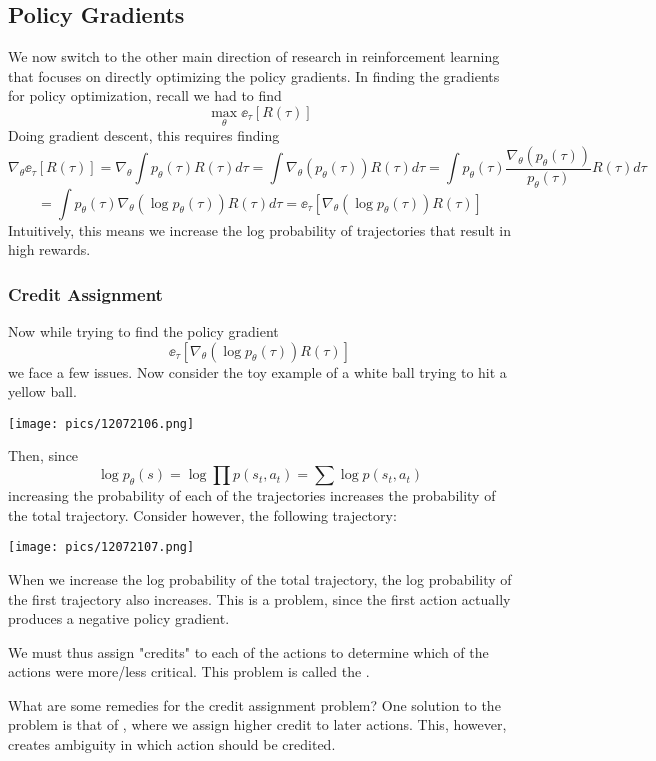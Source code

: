 \documentclass[11pt]{scrartcl}
\begin{document}
\subsection{Policy Gradients}
We now switch to the other main direction of research in reinforcement learning that focuses on directly optimizing the policy gradients. In finding the gradients for policy optimization, recall we had to find 
$$\max_{\theta}\ee_\tau[R(\tau)]$$
Doing gradient descent, this requires finding $$\nabla_\theta\ee_\tau[R(\tau)]=\nabla_\theta\int p_\theta(\tau)R(\tau)d\tau=\int \nabla_\theta(p_\theta(\tau))R(\tau)d\tau=\int p_\theta(\tau)\frac{\nabla_\theta(p_\theta(\tau))}{p_\theta(\tau)}R(\tau)d\tau$$
$$=\int p_\theta(\tau)\nabla_\theta(\log p_\theta(\tau))R(\tau)d\tau=\ee_\tau[\nabla_\theta(\log p_\theta(\tau))R(\tau)]$$
Intuitively, this means we increase the log probability of trajectories that result in high rewards. 

\subsubsection{Credit Assignment}
Now while trying to find the policy gradient $$\ee_\tau[\nabla_\theta(\log p_\theta(\tau))R(\tau)]$$ 
we face a few issues. Now consider the toy example of a white ball trying to hit a yellow ball. 
\begin{center}
    \texttt{[image: pics/12072106.png]}
\end{center}
Then, since $$\log p_\theta(s)=\log\prod p(s_t,a_t)=\sum \log p(s_t,a_t)$$ increasing the probability of each of the trajectories increases the probability of the total trajectory. Consider however, the following trajectory:
\begin{center}
    \texttt{[image: pics/12072107.png]}
\end{center}
When we increase the log probability of the total trajectory, the log probability of the first trajectory also increases. This is a problem, since the first action actually produces a negative policy gradient. 

We must thus assign "credits" to each of the actions to determine which of the actions were more/less critical. This problem is called the . 

What are some remedies for the credit assignment problem? One solution to the problem is that of , where we assign higher credit to later actions. This, however, creates ambiguity in which action should be credited. 
\end{document}
